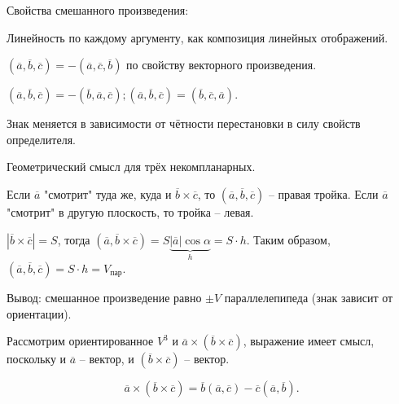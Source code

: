 	Свойства смешанного произведения:
	\begin{MyList}
		\item Линейность по каждому аргументу, как композиция линейных отображений.
		\item $(\overline{a}, \overline{b}, \overline{c}) = - (\overline{a}, \overline{c}, \overline{b})$ по свойству векторного произведения.
		
			  $(\overline{a}, \overline{b}, \overline{c}) = - (\overline{b}, \overline{a}, \overline{c}); (\overline{a}, \overline{b}, \overline{c}) = (\overline{b}, \overline{c}, \overline{a})$.

			  Знак меняется в зависимости от чётности перестановки в силу свойств определителя.
		\item Геометрический смысл для трёх некомпланарных.

			Если $\overline{a}$ "смотрит" туда же, куда и $\overline{b} \times \overline{c}$, то $(\overline{a}, \overline{b}, \overline{c})$ -- правая тройка. Если $\overline{a}$ "смотрит" в другую плоскость, то тройка -- левая.

			$|\overline{b} \times \overline{c}| = S$, тогда $(\overline{a}, \overline{b} \times \overline{c}) = S \underbrace{|\overline{a}| \cos \alpha}_{h} = S\cdot h$.
			Таким образом, $(\overline{a}, \overline{b}, \overline{c}) = S\cdot h = V_{\text{пар}}$. 

			Вывод: смешанное произведение равно $\pm V$ параллелепипеда (знак зависит от ориентации).
	\end{MyList}
	
	\begin{figure}[h]
		\centering
		\def\svgwidth{0.5\columnwidth}
		
	\end{figure}


	Рассмотрим ориентированное $V^3$ и $\overline{a} \times (\overline{b} \times \overline{c})$, выражение имеет смысл, поскольку и $\overline{a}$ -- вектор, и $(\overline{b} \times \overline{c})$ -- вектор. 

	\begin{Prop}
		$$\overline{a} \times (\overline{b} \times \overline{c}) = \overline{b}(\overline{a}, \overline{c}) - \overline{c}(\overline{a}, \overline{b}).$$
	\end{Prop}
		
